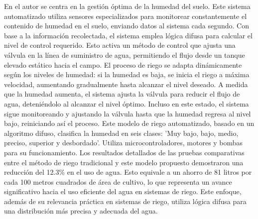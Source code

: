 \bigbreak
En \cite{hasan_implementation_2018} el autor se centra en la gestión óptima de la humedad del suelo. Este sistema automatizado utiliza sensores especializados para monitorear constantemente el contenido de humedad en el suelo, enviando datos al sistema cada segundo. Con base a la información recolectada, el sistema emplea lógica difusa para calcular el nivel de control requerido. Esto activa un método de control que ajusta una válvula en la línea de suministro de agua, permitiendo el flujo desde un tanque elevado estático hacia el campo. El proceso de riego se adapta dinámicamente según los niveles de humedad: si la humedad es baja, se inicia el riego a máxima velocidad, aumentando gradualmente hasta alcanzar el nivel deseado. A medida que la humedad aumenta, el sistema ajusta la válvula para reducir el flujo de agua, deteniéndolo al alcanzar el nivel óptimo. Incluso en este estado, el sistema sigue monitoreando y ajustando la válvula hasta que la humedad regresa al nivel bajo, reiniciando así el proceso. Este modelo de riego automatizado, basado en un algoritmo difuso, clasifica la humedad en seis clases: 'Muy bajo, bajo, medio, preciso, superior y desbordado'. Utiliza microcontroladores, motores y bombas para su funcionamiento. Los resultados detallados de las pruebas comparativas entre el método de riego tradicional y este modelo propuesto demostraron una reducción del 12.3\% en el uso de agua. Esto equivale a un ahorro de 81 litros por cada 100 metros cuadrados de área de cultivo, lo que representa un avance significativo hacia el uso eficiente del agua en sistemas de riego.  Este enfoque, además de su relevancia práctica en sistemas de riego, utiliza lógica difusa para una distribución más precisa y adecuada del agua.

